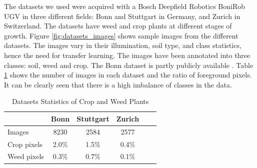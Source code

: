 \documentclass[letterpaper, 10 pt, conference]{ieeeconf}  %
\begin{document}
The datasets we used were acquired with a Bosch Deepfield Robotics BoniRob UGV in three different fields: Bonn and Stuttgart in Germany, and Zurich in Switzerland. The datasets have weed and crop plants at different stages of growth. Figure \ref{fig:datasets_images} shows sample images from the different datasets. The images vary in their illumination, soil type, and class statistics, hence the need for transfer learning. The images have been annotated into three classes: soil, weed and crop. The Bonn dataset is partly publicly available \cite{chebrolu2017agricultural}. Table \ref{tab:datasets_stats} shows the number of images in each dataset and the ratio of foreground pixels. It can be clearly seen that there is a high imbalance of classes in the data.



    \begin{table}
       \vspace{1em}
        \centering
        \caption{Datasets Statistics of Crop and Weed Plants}
        \begin{tabular}{@{}lccccc@{}} 
            \toprule
              & Bonn & Stuttgart & Zurich \\ 
            \midrule 
    		  Images  & 8230 & 2584 & 2577 \\ \addlinespace
    		  Crop pixels & 2.0\% & 1.5\% & 0.4\%  \\ \addlinespace
    		  Weed pixels & 0.3\% & 0.7\% & 0.1\%  \\    
            \bottomrule
        \end{tabular}
        \label{tab:datasets_stats}
    \end{table}
    
\end{document}
